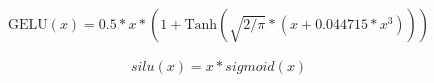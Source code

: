 \[
    \text{GELU}(x) = 0.5 * x * (1 + \text{Tanh}(\sqrt{2 / \pi} * (x + 0.044715 * x^3)))
\]

\begin{align*}
    silu(x)=x*sigmoid(x)
\end{align*}